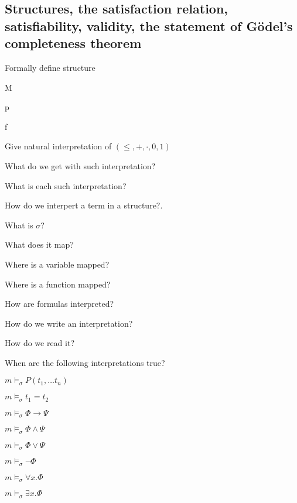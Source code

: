 \documentclass[fleqn]{article}
\begin{document}
\subsection{Structures, the satisfaction relation, satisfiability, validity, the statement of Gödel's completeness theorem}
\begin{enumerate}
    {\color{red}\item Formally define structure}
    \begin{itemize}
        \item M
        {\color{blue}\item p}
        \item f
    \end{itemize}
    {\color{red}\item Give natural interpretation of $(\leq, +, \cdot, 0, 1)$}
    \item What do we get with such interpretation?
    {\color{red}\item What is each such interpretation?}
    {\color{red}\item How do we interpert a term in a structure?.}
    \item What is $\sigma$?
    {\color{blue}\item What does it map?}
    {\color{red}\item Where is a variable mapped?}
    {\color{red}\item Where is a function mapped?}
    {\color{blue}\item How are formulas interpreted?}
    {\color{red}\item How do we write an interpretation?}
    {\color{red}\item How do we read it?}
    \item When are the following interpretations true?
    \begin{itemize}
        \item $m \models_{\sigma} P (t_1, \dots t_n)$
        \item $m \models_{\sigma} t_1 = t_2$
        {\color{red}\item $m \models_{\sigma} \Phi \rightarrow \Psi$}
        \item $m \models_{\sigma} \Phi \wedge \Psi$
        \item $m \models_{\sigma} \Phi \vee \Psi$
        \item $m \models_{\sigma} \neg \Phi$
        {\color{blue}\item $m \models_{\sigma} \forall x. \Phi$}
        {\color{blue}\item $m \models_{\sigma} \exists x. \Phi$}

\end{itemize}
\end{enumerate}
\end{document}
